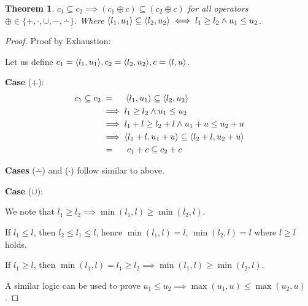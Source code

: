 \newtheorem{theorem}{Theorem}
\newtheorem{lemma}[theorem]{Lemma}

\renewcommand\qedsymbol{}

\begin{theorem}
  \( c_1 \subseteq c_2 \implies (c_1 \oplus c) \subseteq (c_2 \oplus c) \) for all operators \( \oplus \in \{ +, \cdot, \cup, -, \dotminus \}\). Where \( \langle{l_1, u_1}\rangle \subseteq \langle{l_2, u_2}\rangle \iff l_1 \geq l_2 \land u_1 \leq u_2 \).
\end{theorem}

\begin{proof}
  Proof by Exhaustion:

  Let us define \( c_1 = \langle{l_1, u_1}\rangle, c_2 = \langle{l_2, u_2}\rangle, c = \langle{l, u}\rangle \).

  \textbf{Case} (\(+\)):
  \begin{align*}
    c_1 \subseteq c_2 & \; = \hspace{4.5mm} \langle{l_1, u_1}\rangle \subseteq \langle{l_2, u_2}\rangle      \\
                      & \implies l_1 \geq l_2 \land u_1 \leq u_2                             \\
                      & \implies l_1 + l \geq l_2 + l \land u_1 + u \leq u_2 + u             \\
                      & \implies \langle{l_1 + l, u_1 + u}\rangle \subseteq \langle{l_2 + l, u_2 + u}\rangle \\
                      & \; = \hspace{5mm} c_1 + c \subseteq c_2 + c
  \end{align*}

  \textbf{Cases} (\(\dotminus\)) and (\(\cdot\)) follow similar to above.

  \textbf{Case} (\(\cup\)): 
  
  We note that \( l_1 \geq l_2 \implies \min(l_1, l) \geq \min(l_2, l) \). 
  
  If \( l_1 \leq l \), then \( l_2 \leq l_1 \leq l \), hence \( \min(l_1, l) = l \), \( \min(l_2, l) = l \) where \( l \geq l \) holds. 
  
  If \( l_1 \geq l \), then \( \min(l_1, l) = l_1 \geq l_2 \implies \min(l_1, l) \geq \min(l_2, l) \). 
  
  A similar logic can be used to prove \( u_1 \leq u_2  \implies \max(u_1, u) \leq \max(u_2, u) \). 
  

\end{proof}
